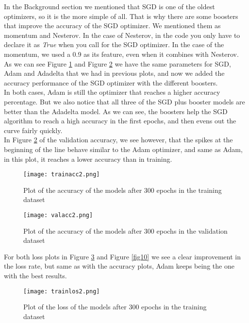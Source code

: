 \documentclass[review]{elsarticle}
\begin{document}
In the Background section we mentioned that SGD is one of the oldest optimizers, so it is the more simple of all. That is why there are some boosters that improve the accuracy of the SGD optimizer. We mentioned them as momentum and Nesterov. In the case of Nesterov, in the code you only have to declare it as \textit{True} when you call for the SGD optimizer. In the case of the momentum, we used a 0.9 as its feature, even when it combines with Nesterov.\\

As we can see Figure \ref{fig7} and Figure \ref{fig8} we have the same parameters for SGD, Adam and Adadelta that we had in previous plots, and now we added the accuracy performance of the SGD optimizer with the different boosters. \\

In both cases, Adam is still the optimizer that reaches a higher accuracy percentage. But we also notice that all three of the SGD plus booster models are better than the Adadelta model. As we can see, the boosters help the SGD algorithm to reach a high accuracy in the first epochs, and then evens out the curve fairly quickly.\\

In Figure \ref{fig8} of the validation accuracy, we see however, that the spikes at the beginning of the line behave similar to the Adam optimizer, and same as Adam, in this plot, it reaches a lower accuracy than in training.\\

\begin{figure}[]
  \centering
  \texttt{[image: trainacc2.png]}  
	\caption{Plot of the accuracy of the models after 300 epochs in the training dataset}
\label{fig7}
\end{figure}

\begin{figure}[]
  \centering
  \texttt{[image: valacc2.png]}  
	\caption{Plot of the accuracy of the models after 300 epochs in the validation dataset}
\label{fig8}
\end{figure}

For both loss plots in Figure \ref{fig9} and Figure \ref{fig10} we see a clear improvement in the loss rate, but same as with the accuracy plots, Adam keeps being the one with the best results.\\

\begin{figure}[]
  \centering
  \texttt{[image: trainlos2.png]}  
	\caption{Plot of the loss of the models after 300 epochs in the training dataset}
\label{fig9}
\end{figure}
\end{document}
